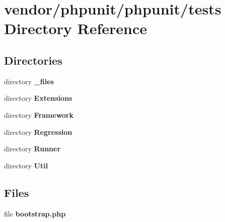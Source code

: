 \section{vendor/phpunit/phpunit/tests Directory Reference}
\label{dir_af6afab04ea56d153e31ef5d9f60459f}
\subsection*{Directories}
\begin{DoxyCompactItemize}
\item 
directory {\bf \+\_\+files}
\item 
directory {\bf Extensions}
\item 
directory {\bf Framework}
\item 
directory {\bf Regression}
\item 
directory {\bf Runner}
\item 
directory {\bf Util}
\end{DoxyCompactItemize}
\subsection*{Files}
\begin{DoxyCompactItemize}
\item 
file {\bf bootstrap.\+php}
\end{DoxyCompactItemize}
